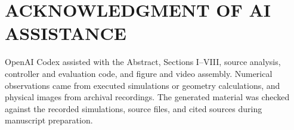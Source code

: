 \documentclass[letterpaper,10pt,conference]{ieeeconf}
\begin{document}
\noindent\begin{minipage}{\columnwidth}
\section*{ACKNOWLEDGMENT OF AI ASSISTANCE}
OpenAI Codex assisted with the Abstract, Sections I--VIII, source analysis, controller and evaluation code, and figure and video assembly. Numerical observations came from executed simulations or geometry calculations, and physical images from archival recordings. The generated material was checked against the recorded simulations, source files, and cited sources during manuscript preparation.
\end{minipage}
\par
{}
\end{document}
